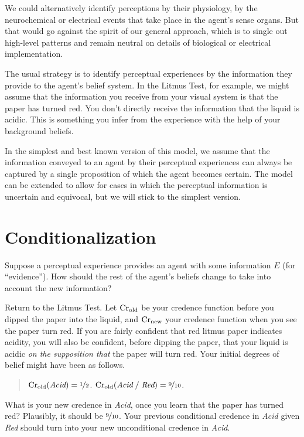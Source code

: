 We could alternatively identify perceptions by their physiology, by the
neurochemical or electrical events that take place in the agent's sense organs.
But that would go against the spirit of our general approach, which is to single
out high-level patterns and remain neutral on details of biological or
electrical implementation.

The usual strategy is to identify perceptual experiences by the information they
provide to the agent's belief system. In the Litmus Test, for example, we might
assume that the information you receive from your visual system is that the
paper has turned red. You don't directly receive the information that the liquid
is acidic. This is something you infer from the experience with the help of your
background beliefs.

In the simplest and best known version of this model, we assume that the
information conveyed to an agent by their perceptual experiences can always be
captured by a single proposition of which the agent becomes certain. The model
can be extended to allow for cases in which the perceptual information is
uncertain and equivocal, but we will stick to the simplest version.

\section{Conditionalization}\label{sec:conditionalization}

Suppose a perceptual experience provides an agent with some information $E$ (for
``evidence''). How should the rest of the agent's beliefs change to take into account
the new information?

Return to the Litmus Test. Let $\text{Cr$_{\text{old}}$}$ be your credence function before you
dipped the paper into the liquid, and $\text{Cr$_{\text{new}}$}$ your credence function when you see
the paper turn red. If you are fairly confident that red litmus paper indicates
acidity, you will also be confident, before dipping the paper, that your liquid
is acidic \emph{on the supposition that} the paper will turn red. Your initial
degrees of belief might have been as follows.

\begin{quote}
$\text{Cr$_{\text{old}}$}(\emph{Acid}) = \nicefrac{1}{2}$.\newline
$\text{Cr$_{\text{old}}$}(\emph{Acid}\;/\;\emph{Red}) = \nicefrac{9}{10}$.
\end{quote}

What is your new credence in \emph{Acid}, once you learn that the paper has
turned red? Plausibly, it should be $\nicefrac{9}{10}$. Your previous conditional
credence in \emph{Acid} given \emph{Red} should turn into your new unconditional
credence in \emph{Acid}.

